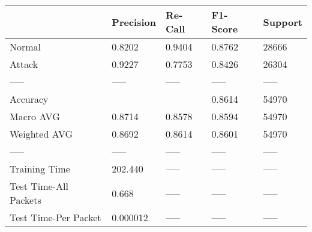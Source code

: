 \begin{tabular}{lllll}
\toprule
{} & Precision & Re-Call & F1-Score & Support \\
\midrule
Normal                &    0.8202 &  0.9404 &   0.8762 &   28666 \\
Attack                &    0.9227 &  0.7753 &   0.8426 &   26304 \\
-----                 &     ----- &   ----- &    ----- &   ----- \\
Accuracy              &           &         &   0.8614 &   54970 \\
Macro AVG             &    0.8714 &  0.8578 &   0.8594 &   54970 \\
Weighted AVG          &    0.8692 &  0.8614 &   0.8601 &   54970 \\
-----                 &     ----- &   ----- &    ----- &   ----- \\
Training Time         &   202.440 &   ----- &    ----- &   ----- \\
Test Time-All Packets &     0.668 &   ----- &    ----- &   ----- \\
Test Time-Per Packet  &  0.000012 &   ----- &    ----- &   ----- \\
\bottomrule
\end{tabular}
